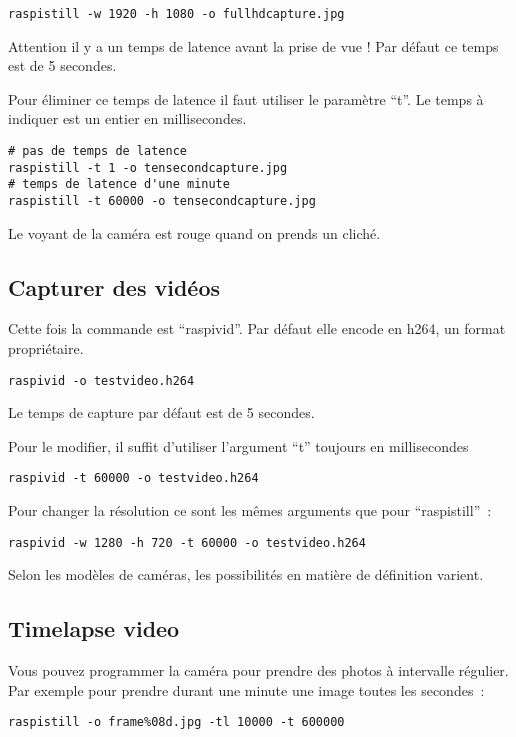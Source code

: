 \begin{verbatim}
raspistill -w 1920 -h 1080 -o fullhdcapture.jpg
\end{verbatim}

Attention il y a un temps de latence avant la prise de vue ! Par défaut ce temps est de 5 secondes.

Pour éliminer ce temps de latence il faut utiliser le paramètre ``t''. Le temps à indiquer est un entier en millisecondes.

\begin{verbatim}
# pas de temps de latence
raspistill -t 1 -o tensecondcapture.jpg
# temps de latence d'une minute
raspistill -t 60000 -o tensecondcapture.jpg
\end{verbatim}

Le voyant de la caméra est rouge quand on prends un cliché.

\subsection{Capturer des vidéos}

Cette fois la commande est ``raspivid''. Par défaut elle encode en h264, un format propriétaire.

\begin{verbatim}
raspivid -o testvideo.h264
\end{verbatim}

Le temps de capture par défaut est de 5 secondes. 

Pour le modifier, il suffit d'utiliser l'argument ``t'' toujours en millisecondes

\begin{verbatim}
raspivid -t 60000 -o testvideo.h264
\end{verbatim}

Pour changer la résolution ce sont les mêmes arguments que pour ``raspistill''~:

\begin{verbatim}
raspivid -w 1280 -h 720 -t 60000 -o testvideo.h264
\end{verbatim}

Selon les modèles de caméras, les possibilités en matière de définition varient.

\subsection{Timelapse video}

Vous pouvez programmer la caméra pour prendre des photos à intervalle régulier. Par exemple pour prendre durant une minute une image toutes les secondes~:
\begin{verbatim}
raspistill -o frame%08d.jpg -tl 10000 -t 600000
\end{verbatim}

